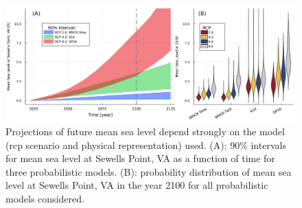 \documentclass[12pt]{article}
\begin{document}
\begin{figure}
    \centering
    \includegraphics[width=\textwidth]{lsl-evolution}
    \caption{
        Projections of future mean sea level depend strongly on the model (\gls{rcp} scenario and physical representation) used.
        (A): 90\% intervals for mean sea level at Sewells Point, VA as a function of time for three probabilistic models.
        (B): probability distribution of mean sea level at Sewells Point, VA in the year 2100 for all probabilistic models considered.
    }\label{fig:lsl-evolution}
\end{figure}
\end{document}

